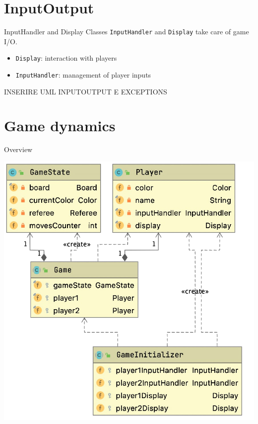 \documentclass{beamer}
\begin{document}
\section{InputOutput}

\begin{frame}{InputHandler and Display}
	Classes \texttt{InputHandler} and \texttt{Display} take care of game I/O.

	\begin{itemize}
		\item \texttt{Display}: interaction with players
	 	\item \texttt{InputHandler}: management of player inputs
	\end{itemize}
	
	INSERIRE UML INPUTOUTPUT E EXCEPTIONS
\end{frame}


\section{Game dynamics}

\begin{frame}{Overview}
	  \begin{center}
     		\includegraphics[scale=0.25]{images/game_uml.png}
     	\end{center}

\end{frame}
\end{document}

